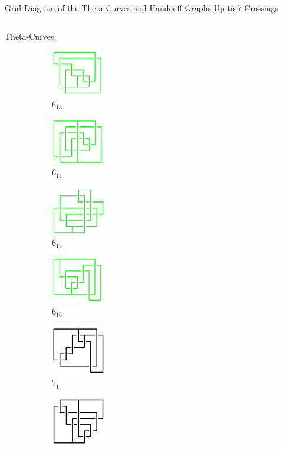 \documentclass[final]{beamer}
\begin{document}
\begin{frame}[t]
\begin{alertblock}{Grid Diagram of the Theta-Curves and Handcuff Graphs Up to 7 Crossings}
\begin{columns}[t]
\begin{column}{0.6\textwidth}
\begin{alertblock}{Theta-Curves}
\begin{figure}
    \begin{subfigure}{0.075\textwidth}
    \includegraphics[width=2.4cm]{../Midterm_Poster/grid_diagram/theta_6_13.png}
    \caption{$6_{13}$} 
    \end{subfigure}
    \begin{subfigure}{0.075\textwidth}
    \includegraphics[width=2.4cm]{../Midterm_Poster/grid_diagram/theta_6_14.png}
    \caption{$6_{14}$} 
    \end{subfigure}
    \begin{subfigure}{0.075\textwidth}
    \includegraphics[width=2.4cm]{../Midterm_Poster/grid_diagram/theta_6_15.png}
    \caption{$6_{15}$} 
    \end{subfigure}
    \begin{subfigure}{0.075\textwidth}
    \includegraphics[width=2.4cm]{../Midterm_Poster/grid_diagram/theta_6_16.png}
    \caption{$6_{16}$} 
    \end{subfigure}
    \begin{subfigure}{0.075\textwidth}
    \includegraphics[width=2.4cm]{../Midterm_Poster/grid_diagram/theta_7_1.png}
    \caption{$7_{1}$} 
    \end{subfigure}
    \begin{subfigure}{0.075\textwidth}
    \includegraphics[width=2.4cm]{../Midterm_Poster/grid_diagram/theta_7_2.png}

\end{subfigure}
\end{figure}
\end{alertblock}
\end{column}
\end{columns}
\end{alertblock}
\end{frame}
\end{document}
